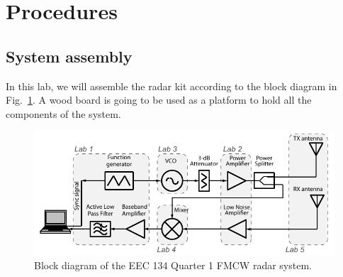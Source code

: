 \documentclass[letterpaper, 11pt]{article}
\begin{document}
\newpage
\section{Procedures}

\subsection{System assembly}
In this lab, we will assemble the radar kit according to the block diagram in Fig.~\ref{fig:eec134system}. A wood board is going to be used as a platform to hold all the components of the system.

\begin{figure}[ht]
	\centering
	\includegraphics{eec134system} %
	\caption{Block diagram of the EEC 134 Quarter 1 FMCW radar system.}
	\label{fig:eec134system}
\end{figure}
\end{document}
